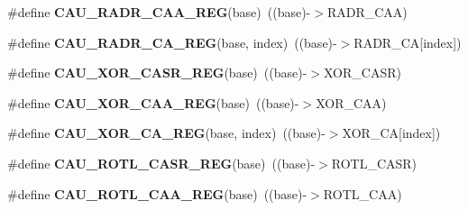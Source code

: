 \begin{DoxyCompactItemize}
\item 
\#define {\bfseries C\+A\+U\+\_\+\+R\+A\+D\+R\+\_\+\+C\+A\+A\+\_\+\+R\+EG}(base)~((base)-\/$>$R\+A\+D\+R\+\_\+\+C\+AA)\hypertarget{group__CAU__Register__Accessor__Macros_gab0ebde83005e4400f15b86691da180e0}{}\label{group__CAU__Register__Accessor__Macros_gab0ebde83005e4400f15b86691da180e0}

\item 
\#define {\bfseries C\+A\+U\+\_\+\+R\+A\+D\+R\+\_\+\+C\+A\+\_\+\+R\+EG}(base,  index)~((base)-\/$>$R\+A\+D\+R\+\_\+\+CA\mbox{[}index\mbox{]})\hypertarget{group__CAU__Register__Accessor__Macros_ga7ebb38f65122d7fa40dde22ddf11d140}{}\label{group__CAU__Register__Accessor__Macros_ga7ebb38f65122d7fa40dde22ddf11d140}

\item 
\#define {\bfseries C\+A\+U\+\_\+\+X\+O\+R\+\_\+\+C\+A\+S\+R\+\_\+\+R\+EG}(base)~((base)-\/$>$X\+O\+R\+\_\+\+C\+A\+SR)\hypertarget{group__CAU__Register__Accessor__Macros_ga393de2803db60a1f80d2600fc1ae7721}{}\label{group__CAU__Register__Accessor__Macros_ga393de2803db60a1f80d2600fc1ae7721}

\item 
\#define {\bfseries C\+A\+U\+\_\+\+X\+O\+R\+\_\+\+C\+A\+A\+\_\+\+R\+EG}(base)~((base)-\/$>$X\+O\+R\+\_\+\+C\+AA)\hypertarget{group__CAU__Register__Accessor__Macros_ga095847819b81c22bcc6b7097f97a5a54}{}\label{group__CAU__Register__Accessor__Macros_ga095847819b81c22bcc6b7097f97a5a54}

\item 
\#define {\bfseries C\+A\+U\+\_\+\+X\+O\+R\+\_\+\+C\+A\+\_\+\+R\+EG}(base,  index)~((base)-\/$>$X\+O\+R\+\_\+\+CA\mbox{[}index\mbox{]})\hypertarget{group__CAU__Register__Accessor__Macros_ga3c7dbe782cb08cb8afa8f998f9d92a11}{}\label{group__CAU__Register__Accessor__Macros_ga3c7dbe782cb08cb8afa8f998f9d92a11}

\item 
\#define {\bfseries C\+A\+U\+\_\+\+R\+O\+T\+L\+\_\+\+C\+A\+S\+R\+\_\+\+R\+EG}(base)~((base)-\/$>$R\+O\+T\+L\+\_\+\+C\+A\+SR)\hypertarget{group__CAU__Register__Accessor__Macros_gabd3703b09269d6a70e8c7b7fc25fe69e}{}\label{group__CAU__Register__Accessor__Macros_gabd3703b09269d6a70e8c7b7fc25fe69e}

\item 
\#define {\bfseries C\+A\+U\+\_\+\+R\+O\+T\+L\+\_\+\+C\+A\+A\+\_\+\+R\+EG}(base)~((base)-\/$>$R\+O\+T\+L\+\_\+\+C\+AA)\hypertarget{group__CAU__Register__Accessor__Macros_ga5f94ba9f977dc0b92e95789a35ac1fc7}{}\label{group__CAU__Register__Accessor__Macros_ga5f94ba9f977dc0b92e95789a35ac1fc7}


\end{DoxyCompactItemize}
